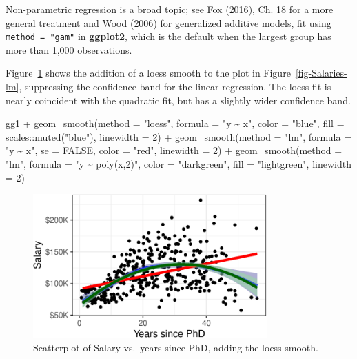 \documentclass[
  letterpaper,
  10pt,
  krantz2]{krantz}
\makeatletter
\newenvironment{Shaded}{\begin{snugshade}}{\end{snugshade}}
\newcommand{\AttributeTok}[1]{\textcolor[rgb]{0.40,0.45,0.13}{#1}}
\newcommand{\ConstantTok}[1]{\textcolor[rgb]{0.56,0.35,0.01}{#1}}
\newcommand{\DecValTok}[1]{\textcolor[rgb]{0.68,0.00,0.00}{#1}}
\newcommand{\FunctionTok}[1]{\textcolor[rgb]{0.28,0.35,0.67}{#1}}
\newcommand{\NormalTok}[1]{\textcolor[rgb]{0.00,0.23,0.31}{#1}}
\newcommand{\SpecialCharTok}[1]{\textcolor[rgb]{0.37,0.37,0.37}{#1}}
\newcommand{\StringTok}[1]{\textcolor[rgb]{0.13,0.47,0.30}{#1}}
\newenvironment{kframe}{%
  \medskip{}
  \setlength{\fboxsep}{.8em}
  \def\at@end@of@kframe{}%
  \ifinner\ifhmode%
  \def\at@end@of@kframe{\end{minipage}}%
  \begin{minipage}{\columnwidth}%
  \fi\fi%
  \def\FrameCommand##1{\hskip\@totalleftmargin \hskip-\fboxsep
  \colorbox{shadecolor}{##1}\hskip-\fboxsep
      \hskip-\linewidth \hskip-\@totalleftmargin \hskip\columnwidth}%
  \MakeFramed {\advance\hsize-\width
    \@totalleftmargin\z@ \linewidth\hsize
    \@setminipage}}%
{\par\unskip\endMakeFramed%
  \at@end@of@kframe}
\renewenvironment{Shaded}{\begin{kframe}}{\end{kframe}}
\makeatother
\begin{document}
Non-parametric regression is a broad topic; see Fox
(\protect\hyperlink{ref-Fox:2016:ARA}{2016}), Ch. 18 for a more general
treatment and Wood (\protect\hyperlink{ref-Wood:2006}{2006}) for
generalized additive models, fit using \texttt{method\ =\ "gam"} in
\textbf{ggplot2}, which is the default when the largest group has more
than 1,000 observations.

Figure~\ref{fig-Salaries-loess} shows the addition of a loess smooth to
the plot in Figure~\ref{fig-Salaries-lm}, suppressing the confidence
band for the linear regression. The loess fit is nearly coincident with
the quadratic fit, but has a slightly wider confidence band.

\begin{Shaded}
\begin{Highlighting}[]
\NormalTok{gg1 }\SpecialCharTok{+} 
  \FunctionTok{geom\_smooth}\NormalTok{(}\AttributeTok{method =} \StringTok{"loess"}\NormalTok{, }\AttributeTok{formula =} \StringTok{"y \textasciitilde{} x"}\NormalTok{, }
              \AttributeTok{color =} \StringTok{"blue"}\NormalTok{, }\AttributeTok{fill =}\NormalTok{ scales}\SpecialCharTok{::}\FunctionTok{muted}\NormalTok{(}\StringTok{"blue"}\NormalTok{),}
              \AttributeTok{linewidth =} \DecValTok{2}\NormalTok{) }\SpecialCharTok{+}
  \FunctionTok{geom\_smooth}\NormalTok{(}\AttributeTok{method =} \StringTok{"lm"}\NormalTok{, }\AttributeTok{formula =} \StringTok{"y \textasciitilde{} x"}\NormalTok{, }\AttributeTok{se =} \ConstantTok{FALSE}\NormalTok{,}
              \AttributeTok{color =} \StringTok{"red"}\NormalTok{,}
              \AttributeTok{linewidth =} \DecValTok{2}\NormalTok{) }\SpecialCharTok{+}
  \FunctionTok{geom\_smooth}\NormalTok{(}\AttributeTok{method =} \StringTok{"lm"}\NormalTok{, }\AttributeTok{formula =} \StringTok{"y \textasciitilde{} poly(x,2)"}\NormalTok{, }
              \AttributeTok{color =} \StringTok{"darkgreen"}\NormalTok{, }\AttributeTok{fill =} \StringTok{"lightgreen"}\NormalTok{,}
              \AttributeTok{linewidth =} \DecValTok{2}\NormalTok{) }
\end{Highlighting}
\end{Shaded}

\begin{figure}[H]

{\centering \includegraphics[width=0.8\textwidth,height=\textheight]{figs/ch03/fig-Salaries-loess-1.pdf}

}

\caption{\label{fig-Salaries-loess}Scatterplot of Salary vs.~years since
PhD, adding the loess smooth.}

\end{figure}
\end{document}
